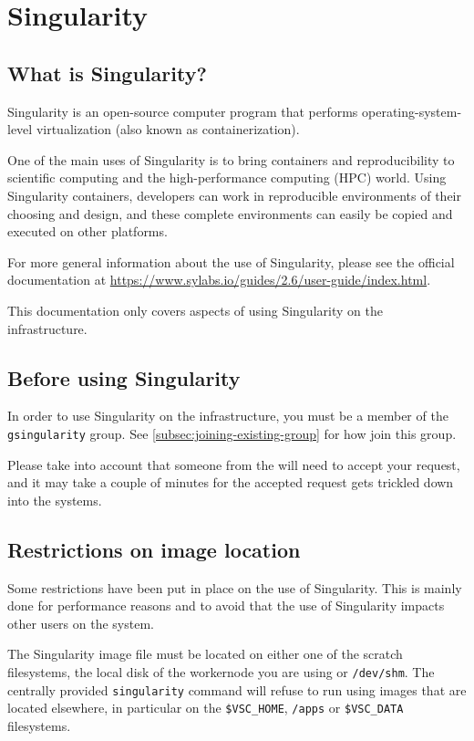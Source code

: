 \chapter{Singularity}
\label{ch:singularity}

\section{What is Singularity?}

Singularity is an open-source computer program that performs operating-system-level virtualization (also known as containerization).

One of the main uses of Singularity is to bring containers and reproducibility to
scientific computing and the high-performance computing (HPC) world.
Using Singularity containers, developers can work in reproducible environments of their choosing and design,
and these complete environments can easily be copied and executed on other platforms.

For more general information about the use of Singularity, please see the official documentation at \url{https://www.sylabs.io/guides/2.6/user-guide/index.html}.

This documentation only covers aspects of using Singularity on the \hpcInfra infrastructure.

\section{Before using Singularity}

In order to use Singularity on the \hpcInfra infrastructure, you must be a member of the \lstinline|gsingularity| group.
See \autoref{subsec:joining-existing-group} for how join this group.

Please take into account that someone from the \hpcTeam will need to accept your request,
and it may take a couple of minutes for the accepted request gets trickled down into the
\hpcInfra systems.

\section{Restrictions on image location}

Some restrictions have been put in place on the use of Singularity. This is mainly done
for performance reasons and to avoid that the use of Singularity impacts other users on the system.

The Singularity image file must be located on either one of the scratch filesystems,
the local disk of the workernode you are using or \lstinline|/dev/shm|. The centrally provided \lstinline|singularity|
command will refuse to run using images that are located elsewhere, in particular on the \lstinline|$VSC_HOME|,
\lstinline|/apps| or \lstinline|$VSC_DATA| filesystems.

